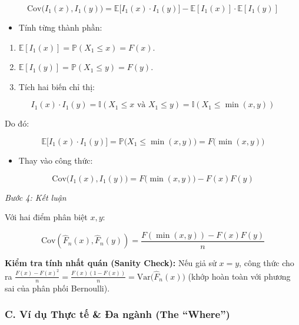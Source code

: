 \documentclass[12pt,a4paper]{article}
\renewenvironment{quote}{\begin{ghichu}}{\end{ghichu}}
\begin{document}
\[\text{Cov}\big(I_1(x), I_1(y)\big) = \mathbb{E}\big[I_1(x) \cdot I_1(y)\big] - \mathbb{E}[I_1(x)] \cdot \mathbb{E}[I_1(y)]\]

\begin{itemize}

\item
  Tính từng thành phần:
\end{itemize}

\begin{enumerate}
\def\labelenumi{\arabic{enumi}.}

\item
  \(\mathbb{E}[I_1(x)] = \mathbb{P}(X_1 \le x) = F(x)\).
\item
  \(\mathbb{E}[I_1(y)] = \mathbb{P}(X_1 \le y) = F(y)\).
\item
  Tích hai biến chỉ thị:
\end{enumerate}

\[I_1(x) \cdot I_1(y) = \mathbb{I}(X_1 \le x \text{ và } X_1 \le y) = \mathbb{I}(X_1 \le \min(x, y))\]

Do đó:

\[\mathbb{E}\big[I_1(x) \cdot I_1(y)\big] = \mathbb{P}\big(X_1 \le \min(x, y)\big) = F\big(\min(x, y)\big)\]

\begin{itemize}

\item
  Thay vào công thức:
\end{itemize}

\[\text{Cov}\big(I_1(x), I_1(y)\big) = F\big(\min(x, y)\big) - F(x)F(y)\]

\emph{Bước 4: Kết luận}

Với hai điểm phân biệt \(x, y\):

\[\text{Cov}\left(\widehat{F}_n(x), \widehat{F}_n(y)\right) = \frac{F(\min(x, y)) - F(x)F(y)}{n}\]

\begin{quote}
\textbf{Kiểm tra tính nhất quán (Sanity Check):}
Nếu giả sử \(x = y\), công thức cho ra \(\frac{F(x) - F(x)^2}{n} = \frac{F(x)(1 - F(x))}{n} = \text{Var}\big(\widehat{F}_n(x)\big)\) (khớp hoàn toàn với phương sai của phân phối Bernoulli).
\end{quote}

\subsubsection{C. Ví dụ Thực tế \& Đa ngành (The ``Where'')}\label{c.-vuxed-dux1ee5-thux1ef1c-tux1ebf-ux111a-nguxe0nh-the-where-3}
\end{document}

